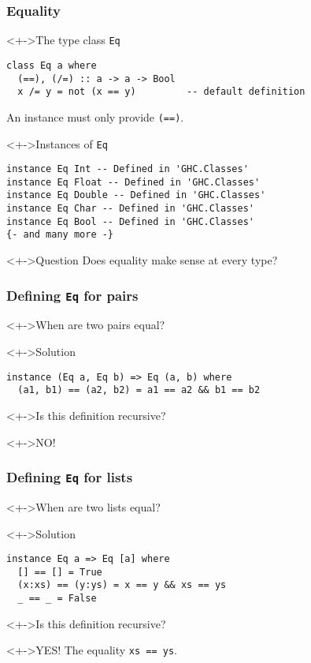 \documentclass{beamer}
\begin{document}
\begin{frame}[fragile]
  \frametitle{Equality}
  \begin{block}<+->{The type class \texttt{Eq}}
\begin{lstlisting}
class Eq a where
  (==), (/=) :: a -> a -> Bool
  x /= y = not (x == y)         -- default definition
\end{lstlisting}
    An instance must only provide \texttt{(==)}.
  \end{block}
  \begin{block}<+->{Instances of \texttt{Eq}}
\begin{lstlisting}
instance Eq Int -- Defined in 'GHC.Classes'
instance Eq Float -- Defined in 'GHC.Classes'
instance Eq Double -- Defined in 'GHC.Classes'
instance Eq Char -- Defined in 'GHC.Classes'
instance Eq Bool -- Defined in 'GHC.Classes'
{- and many more -}
\end{lstlisting}
  \end{block}
  \begin{alertblock}<+->{Question}
    Does equality make sense at every type?
  \end{alertblock}
\end{frame}
\begin{frame}[fragile]
  \frametitle{Defining \texttt{Eq} for pairs}
  \begin{block}<+->{When are two pairs equal?}
  \end{block}
  \begin{block}<+->{Solution}
\begin{lstlisting}
instance (Eq a, Eq b) => Eq (a, b) where
  (a1, b1) == (a2, b2) = a1 == a2 && b1 == b2
\end{lstlisting}
  \end{block}
  \begin{block}<+->{Is this definition recursive?}
  \end{block}
  \begin{alertblock}<+->{NO!}
  \end{alertblock}
\end{frame}
\begin{frame}[fragile]
  \frametitle{Defining \texttt{Eq} for lists}
  \begin{block}<+->{When are two lists equal?}
  \end{block}
  \begin{block}<+->{Solution}
\begin{lstlisting}
instance Eq a => Eq [a] where
  [] == [] = True
  (x:xs) == (y:ys) = x == y && xs == ys
  _ == _ = False
\end{lstlisting}
  \end{block}
  \begin{block}<+->{Is this definition recursive?}
  \end{block}
  \begin{alertblock}<+->{YES!}
    The equality \texttt{xs == ys}.
  \end{alertblock}
\end{frame}
\end{document}
